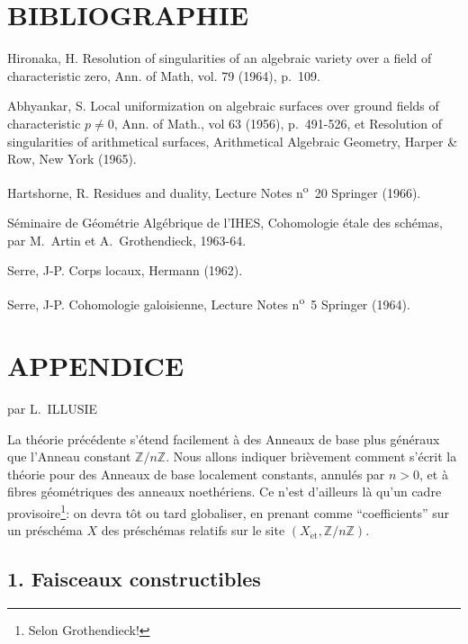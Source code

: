 \documentclass[11pt]{article}
\newcommand{\Z}{\mathbb{Z}}
\providecommand{\Z}{\mathbb Z}
\begin{document}
\section*{BIBLIOGRAPHIE}

\begin{description}[leftmargin=2.5cm,style=nextline]
\item[{[2]}]
Hironaka, H. Resolution of singularities of an algebraic variety over a field of characteristic zero, Ann. of Math, vol. 79 (1964), p.~109.
\item[{[1]}] Abhyankar, S. Local uniformization on algebraic surfaces over ground fields of characteristic $p\ne0$, Ann. of Math., vol 63 (1956), p.~491-526, et Resolution of singularities of arithmetical surfaces, Arithmetical Algebraic Geometry, Harper \& Row, New York (1965).
\item[{[H]}] Hartshorne, R. Residues and duality, Lecture Notes n\textsuperscript{o}~20 Springer (1966).
\item[{[SGAA]}] Séminaire de Géométrie Algébrique de l'IHES, Cohomologie étale des schémas, par M.~Artin et A.~Grothendieck, 1963-64.
\item[{[CL]}] Serre, J-P. Corps locaux, Hermann (1962).
\item[{[CG]}] Serre, J-P. Cohomologie galoisienne, Lecture Notes n\textsuperscript{o}~5 Springer (1964).
\end{description}

\section*{APPENDICE}
\begin{center}
par L.~ILLUSIE
\end{center}

La théorie précédente s'étend facilement à des Anneaux de base plus généraux que l'Anneau constant $\Z/n\Z$. Nous allons indiquer brièvement comment s'écrit la théorie pour des Anneaux de base localement constants, annulés par $n>0$, et à fibres géométriques des anneaux noethériens. Ce n'est d'ailleurs là qu'un cadre provisoire\footnote{Selon Grothendieck!}: on devra tôt ou tard globaliser, en prenant comme ``coefficients'' sur un préschéma $X$ des préschémas relatifs sur le site $(X_{\mathrm{\acute et}},\Z/n\Z)$.

\subsection*{1. Faisceaux constructibles}
\end{document}
